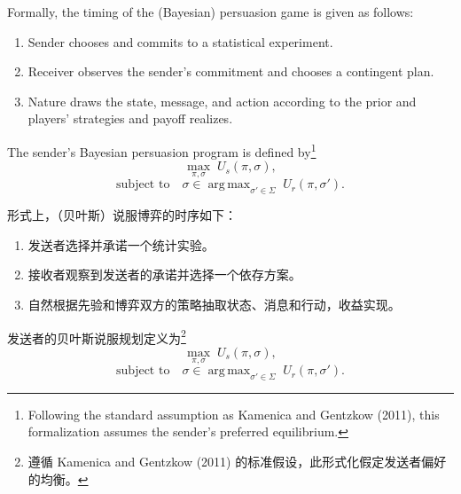 \documentclass[12pt,a4paper]{article}
\theoremstyle{definition}
\theoremstyle{remark}
\newenvironment{original}{%
    \par\medskip\noindent%
    \begin{tcolorbox}[%
        colback=white,%
        colframe=black!50,%
        title=\textbf{Original English},%
        fonttitle=\small\bfseries,%
        left=0pt, right=0pt, top=2pt, bottom=2pt,%
        boxrule=0.5pt,%
        arc=0pt,%
        outer arc=0pt%
    ]%
    \small%
}{%
    \end{tcolorbox}%
}
\newenvironment{translation}{%
    \par\smallskip\noindent%
    \begin{tcolorbox}[%
        colback=blue!3!white,%
        colframe=blue!40!black,%
        title=\textbf{中文翻译},%
        fonttitle=\small\bfseries,%
        left=0pt, right=0pt, top=2pt, bottom=2pt,%
        boxrule=0.5pt,%
        arc=0pt,%
        outer arc=0pt%
    ]%
    \small\color{blue!60!black}%
}{%
    \end{tcolorbox}\medskip%
}
\DeclareMathOperator{\argmax}{arg\,max}
\begin{document}
\begin{original}
Formally, the timing of the (Bayesian) persuasion game is given as follows:
\begin{enumerate}
    \item Sender chooses and commits to a statistical experiment.
    \item Receiver observes the sender's commitment and chooses a contingent plan.
    \item Nature draws the state, message, and action according to the prior and players' strategies and payoff realizes.
\end{enumerate}

The sender's Bayesian persuasion program is defined by\footnote{Following the standard assumption as Kamenica and Gentzkow (2011), this formalization assumes the sender's preferred equilibrium.}
\[
\max_{\pi, \sigma} \; U_s(\pi, \sigma),
\]
\[
\text{subject to} \quad \sigma \in \argmax_{\sigma' \in \Sigma} \; U_r(\pi, \sigma').
\]
\end{original}
\begin{translation}
形式上，（贝叶斯）说服博弈的时序如下：
\begin{enumerate}
    \item 发送者选择并承诺一个统计实验。
    \item 接收者观察到发送者的承诺并选择一个依存方案。
    \item 自然根据先验和博弈双方的策略抽取状态、消息和行动，收益实现。
\end{enumerate}

发送者的贝叶斯说服规划定义为\footnote{遵循 Kamenica and Gentzkow (2011) 的标准假设，此形式化假定发送者偏好的均衡。}
\[
\max_{\pi, \sigma} \; U_s(\pi, \sigma),
\]
\[
\text{subject to} \quad \sigma \in \argmax_{\sigma' \in \Sigma} \; U_r(\pi, \sigma').
\]
\end{translation}
\end{document}
